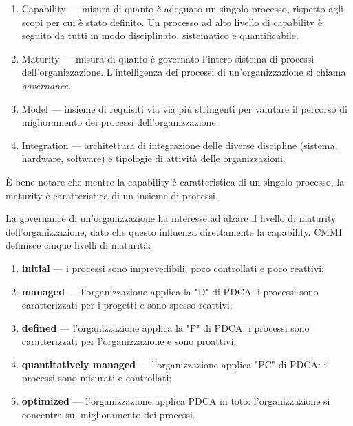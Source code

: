 \documentclass[a4paper]{article}
\begin{document}
	\begin{enumerate}
		
			
	\item Capability --- misura di quanto è adeguato un singolo processo, rispetto agli scopi per cui è stato definito. Un processo ad alto livello di capability è seguito da tutti in modo disciplinato, sistematico e quantificabile.
			
	\item Maturity --- misura di quanto è governato l'intero sistema di processi dell'organizzazione. L'intelligenza dei processi di un'organizzazione si chiama \emph{governance}.
			
	\item Model --- insieme di requisiti via via più stringenti per valutare il percorso di miglioramento dei processi dell'organizzazione.
			
	\item Integration --- architettura di integrazione delle diverse discipline (sistema, hardware, software) e tipologie di attività delle organizzazioni.
		
	\end{enumerate}

		
È bene notare che mentre la capability è caratteristica di un singolo processo, la maturity è caratteristica di un insieme di processi.
		
La governance di un'organizzazione ha interesse ad alzare il livello di maturity dell'organizzazione, dato che questo influenza direttamente la capability. CMMI definisce cinque livelli di maturità:
		
	\begin{enumerate}
		
			
	\item \textbf{initial} --- i processi sono imprevedibili, poco controllati e poco reattivi;
			
	\item \textbf{managed} --- l'organizzazione applica la "D" di PDCA: i processi sono caratterizzati per i progetti e sono spesso reattivi;
			
	\item \textbf{defined} --- l'organizzazione applica la "P" di PDCA: i processi sono caratterizzati per l'organizzazione e sono proattivi;
			
	\item \textbf{quantitatively managed} --- l'organizzazione applica "PC" di PDCA: i processi sono misurati e controllati;
			
	\item \textbf{optimized} --- l'organizzazione applica PDCA in toto: l'organizzazione si concentra sul miglioramento dei processi.
		
	\end{enumerate}
\end{document}
